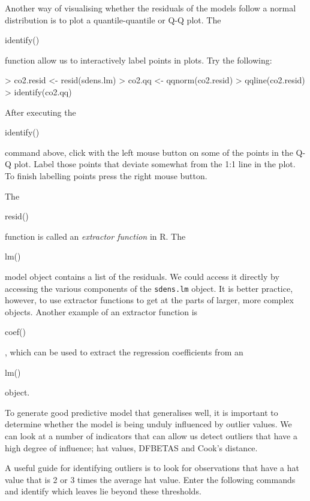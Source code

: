 \documentclass[letterpaper,10pt]{article}
\newenvironment{rline}{\begin{small}\begin{ttfamily}}{\end{ttfamily}\end{small}}
\begin{document}
Another way of visualising whether the residuals of the models follow a normal distribution is to plot a quantile-quantile or Q-Q plot. The \begin{rline}identify()\end{rline} function allow us to interactively label points in plots. Try the following:

\begin{Schunk}
\begin{Sinput}
> co2.resid <- resid(sdens.lm)
> co2.qq <- qqnorm(co2.resid)
> qqline(co2.resid)
> identify(co2.qq)
\end{Sinput}
\end{Schunk}


After executing the \begin{rline}identify()\end{rline} command above, click with the left mouse button on some of the points in the Q-Q plot. Label those points that deviate somewhat from the 1:1 line in the plot. To finish labelling points press the right mouse button.

The \begin{rline}resid()\end{rline} function is called an \textit{extractor function} in R. The \begin{rline}lm()\end{rline} model object contains a list of the residuals. We could access it directly by accessing the various components of the \texttt{sdens.lm} object. It is better practice, however, to use extractor functions to get at the parts of larger, more complex objects. Another example of an extractor function is \begin{rline}coef()\end{rline}, which can be used to extract the regression coefficients from an \begin{rline}lm()\end{rline} object.

To generate good predictive model that generalises well, it is important to determine whether the model is being unduly influenced by outlier values. We can look at a number of indicators that can allow us detect outliers that have a high degree of influence; hat values, DFBETAS and Cook's distance.

A useful guide for identifying outliers is to look for observations that have a hat value that is 2 or 3 times the average hat value. Enter the following commands and identify which leaves lie beyond these thresholds.
\end{document}

